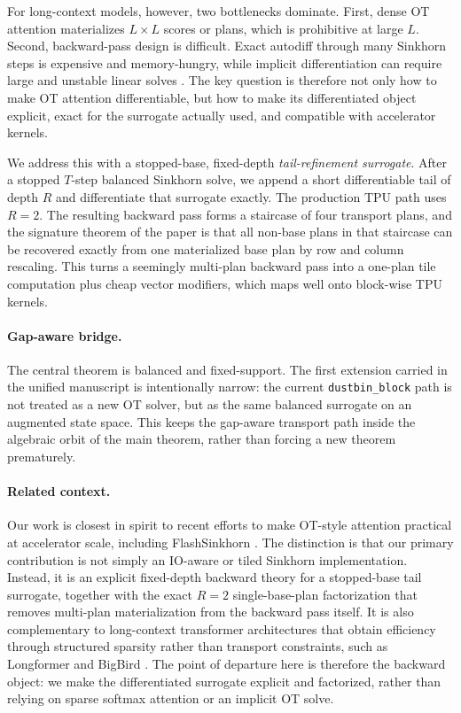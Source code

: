 For long-context models, however, two bottlenecks dominate. First, dense OT attention materializes $L\times L$ scores or plans, which is prohibitive at large $L$. Second, backward-pass design is difficult. Exact autodiff through many Sinkhorn steps is expensive and memory-hungry, while implicit differentiation can require large and unstable linear solves \citep{luise2018differential, bai2019deep}. The key question is therefore not only how to make OT attention differentiable, but how to make its differentiated object explicit, exact for the surrogate actually used, and compatible with accelerator kernels.

We address this with a stopped-base, fixed-depth \emph{tail-refinement surrogate}. After a stopped $T$-step balanced Sinkhorn solve, we append a short differentiable tail of depth $R$ and differentiate that surrogate exactly. The production TPU path uses $R=2$. The resulting backward pass forms a staircase of four transport plans, and the signature theorem of the paper is that all non-base plans in that staircase can be recovered exactly from one materialized base plan by row and column rescaling. This turns a seemingly multi-plan backward pass into a one-plan tile computation plus cheap vector modifiers, which maps well onto block-wise TPU kernels.

\paragraph{Gap-aware bridge.}
The central theorem is balanced and fixed-support. The first extension carried in the unified manuscript is intentionally narrow: the current \texttt{dustbin\_block} path is not treated as a new OT solver, but as the same balanced surrogate on an augmented state space. This keeps the gap-aware transport path inside the algebraic orbit of the main theorem, rather than forcing a new theorem prematurely.

\paragraph{Related context.}
Our work is closest in spirit to recent efforts to make OT-style attention practical at accelerator scale, including FlashSinkhorn \citep{flashsinkhorn2024}. The distinction is that our primary contribution is not simply an IO-aware or tiled Sinkhorn implementation. Instead, it is an explicit fixed-depth backward theory for a stopped-base tail surrogate, together with the exact $R=2$ single-base-plan factorization that removes multi-plan materialization from the backward pass itself. It is also complementary to long-context transformer architectures that obtain efficiency through structured sparsity rather than transport constraints, such as Longformer \citep{beltagy2020longformer} and BigBird \citep{zaheer2020bigbird}. The point of departure here is therefore the backward object: we make the differentiated surrogate explicit and factorized, rather than relying on sparse softmax attention or an implicit OT solve.

